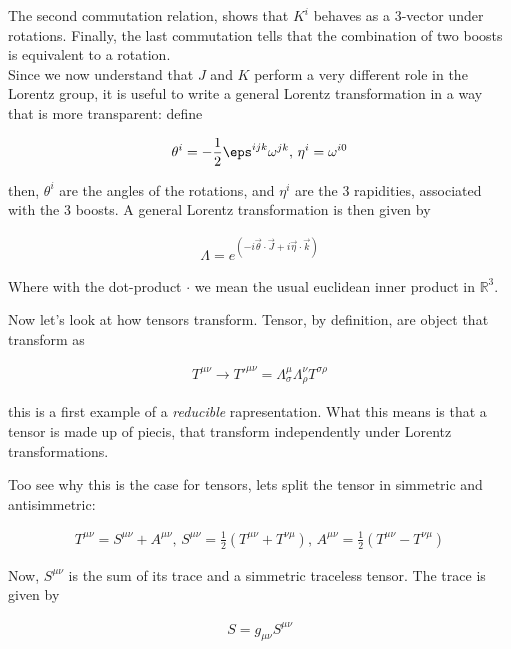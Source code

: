 \documentclass{report}
\begin{document}
The second commutation relation, shows that \(K^i\) behaves as a 3-vector under rotations. Finally, the last commutation tells that the combination of two boosts is equivalent to a rotation. \\

Since we now understand that \(J\) and \(K\) perform a very different role in the Lorentz group, it is useful to write a general Lorentz transformation in a way that is more transparent: define 

\begin{align}
    \theta^i = -\frac{1}{2}\eps^{ijk}\omega^{jk}, \, \eta^i = \omega^{i0}
\end{align}

then, \(\theta^i\) are the angles of the rotations, and \(\eta^i\) are the 3 rapidities, associated with the 3 boosts. A general Lorentz transformation is then given by 

\begin{align}
    \Lambda = e^{(-i\vec{\theta}\cdot \vec{J} + i \vec{\eta}\cdot \vec{k})}
\end{align}

Where with the dot-product \(\cdot\) we mean the usual euclidean inner product in \(\mathbb{R}^3\). 

Now let's look at how tensors transform. Tensor, by definition, are object that transform as 

\begin{align}
    T^{\mu\nu} \rightarrow T'^{\mu\nu} = \Lambda^\mu_\sigma \Lambda^{\nu}_\rho T^{\sigma\rho}
\end{align}

this is a first example of a \emph{reducible} rapresentation. What this means is that a tensor is made up of piecis, that transform independently under Lorentz transformations. 

Too see why this is the case for tensors, lets split the tensor in simmetric and antisimmetric: 

\begin{align}
    T^{\mu\nu} = S^{\mu\nu} + A^{\mu\nu}, \, S^{\mu\nu} = \frac{1}{2}(T^{\mu\nu}+ T^{\nu\mu}), \, A^{\mu\nu} = \frac{1}{2}(T^{\mu\nu} - T^{\nu\mu})
\end{align}

Now, \(S^{\mu\nu}\) is the sum of its trace and a simmetric traceless tensor. The trace is given by 

\begin{align}
    S = g_{\mu\nu}S^{\mu\nu} 
\end{align}
\end{document}
